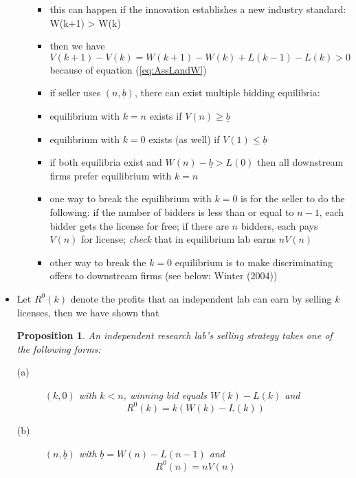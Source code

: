 \documentclass[11pt,english]{beamer}
\newtheorem{proposition}{Proposition}
\begin{document}
\begin{frame}[allowframebreaks]
\begin{itemize}
\begin{itemize}
\begin{itemize}
\item this can happen if the innovation establishes a new industry standard: W(k+1) > W(k)\\
\label{sec-2-3-4-2-1}%
\item then we have
\label{sec-2-3-4-2-2}%
\begin{equation*}
V(k+1) - V(k) = W(k+1) - W(k) + L(k-1) - L(k) >0
\end{equation*}
because of equation (\ref{eq:AssLandW})

\item if seller uses $(n,\underline b)$, there can exist multiple bidding equilibria:\\
\label{sec-2-3-4-2-3}%
\item equilibrium with $k=n$ exists if $V(n) \geq \underline b$\\
\label{sec-2-3-4-2-4}%
\item equilibrium with $k=0$ exists (as well) if $V(1) \leq \underline b$\\
\label{sec-2-3-4-2-5}%
\item if both equilibria exist and $W(n) - \underline b > L(0)$ then all downstream firms prefer equilibrium with $k=n$\\
\label{sec-2-3-4-2-6}%
\item one way to break the equilibrium with $k=0$ is for the seller to do the following: if the number of bidders is less than or equal to $n-1$, each bidder gets the license for free; if there are $n$ bidders, each pays $V(n)$ for license; \emph{check} that in equilibrium lab earns $nV(n)$\\
\label{sec-2-3-4-2-7}%
\item other way to break the $k=0$ equilibrium is to make discriminating offers to downstream firms (see below: Winter (2004))\\
\label{sec-2-3-4-2-8}%
\end{itemize} %
\end{itemize} %

\item Let $R^{0}(k)$ denote the profits that an independent lab can
  earn by selling $k$ licenses, then we have shown that

\newpage

\label{sec-2-3-5}%
\begin{proposition} \label{propos:indepLab}
An independent research lab's selling strategy takes one of the
following forms:
\begin{description}
\item[(a)] $(k,0)$ with $k<n$, winning bid equals $W(k)-L(k)$ and
\begin{equation*}
R^0(k) = k(W(k)-L(k))
\end{equation*}
\item[(b)] $(n,\underline b)$ with $\underline b = W(n)-L(n-1)$ and
\begin{equation*}
R^0(n) = nV(n)
\end{equation*}
\end{description}
\end{proposition}



\end{itemize}
\end{frame}
\end{document}
